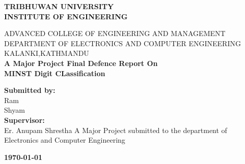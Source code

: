 \documentclass[12pt,a4paper]{report}
\begin{document}
\begin{center}
    \MakeUppercase{\textbf{\large{Tribhuwan University}}}\\
    \textbf{\large{INSTITUTE OF ENGINEERING}}

    \MakeUppercase{Advanced College of Engineering and Management}
    \MakeUppercase{Department of electronics and computer engineering}
    \MakeUppercase{kalanki,kathmandu}\\
    \vspace{6cm}
    \textbf{\large{A Major Project Final Defence Report On\\
            MINST Digit CLassification}}
            
    \vspace{2cm}
    
    \textbf{\large{Submitted by:}\\}
            Ram\\
            Shyam\\
    \vspace{2cm}
    \textbf{\large{Supervisor:}}\\
        Er. Anupam Shrestha
    \vfill
    A Major Project submitted to the department of Electronics and Computer Engineering

    \textbf{\today}
\end{center}
\end{document}
